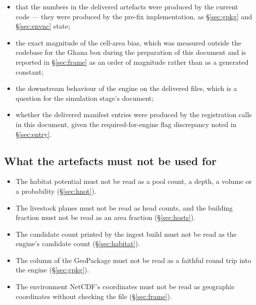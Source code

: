 \documentclass[11pt,a4paper]{article} \usepackage[utf8]{inputenc} \usepackage{lmodern} \usepackage[T1]{fontenc}
\begin{document}
\begin{itemize}
\item that the numbers in the delivered artefacts were produced by the current code --- they were
produced by the pre-fix implementation, as \S\ref{sec:gpkg} and \S\ref{sec:envnc} state; 
\item the exact magnitude of the
cell-area bias, which was measured outside the codebase for the Ghana box during the
preparation of this document and is reported in \S\ref{sec:frame} as an order of magnitude
rather than as a generated constant;
\item the downstream behaviour of the engine on the delivered files, which is a question for the
simulation stage's document; 
\item whether the delivered manifest entries were produced by the
registration calls in this document, given the required-for-engine flag discrepancy noted in
\S\ref{sec:entry}.
\end{itemize}

\subsection{What the artefacts must not be used for}

\begin{itemize} 
\item The habitat potential must not be read as a pool count, a depth, a volume
or a probability (\S\ref{sec:hnot}). 
\item The livestock planes must not be read as head counts,
and the building fraction must not be read as an area fraction (\S\ref{sec:hosts}). 
\item The
candidate count printed by the ingest build must not be read as the engine's candidate count
(\S\ref{sec:habitat}). 
\item The  column of the GeoPackage must not be read as a
faithful round trip into the engine (\S\ref{sec:gpkg}). 
\item The environment NetCDF's
coordinates must not be read as geographic coordinates without checking the file
(\S\ref{sec:frame}).
\end{itemize}
\end{document}
